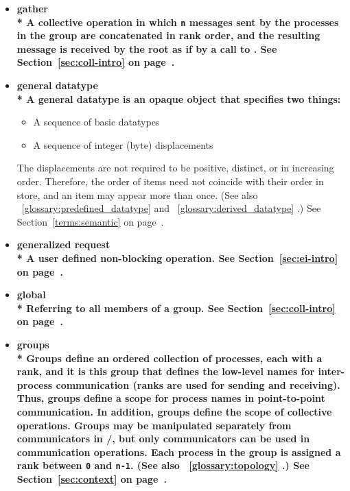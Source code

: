 \begin{itemize}
\label{glossary:gather}
\item \bf{ gather} \\*
A collective operation in which {\tt n} messages sent by the
processes in the group are concatenated in rank order, and the
resulting message is received by the root as if by a call to
.
See Section~\ref{sec:coll-intro} on page~\pageref{sec:coll-intro}.

\label{glossary:general_datatype}
\item \bf{ general datatype} \\*
A {\bf general datatype} is an opaque object that specifies two
things:
\begin{itemize}
\item
A sequence of basic datatypes
\item
A sequence of integer (byte) displacements
\end{itemize}
The displacements are not required to be positive, distinct, or
in increasing order. Therefore, the order of items need not
coincide with their order in store, and an item may appear more than
once. (See also ~\ref{glossary:predefined_datatype} and ~\ref{glossary:derived_datatype} .)
See Section~\ref{terms:semantic} on page~\pageref{terms:semantic}.

\label{glossary:generalized_request}
\item \bf{ generalized request} \\*
A user defined non-blocking operation.
See Section~\ref{sec:ei-intro} on page~\pageref{sec:ei-intro}.

\label{glossary:global}
\item \bf{ global} \\*
Referring to all members of a group.
See Section~\ref{sec:coll-intro} on page~\pageref{sec:coll-intro}.

\label{glossary:groups}
\item \bf{ groups} \\*
Groups define an ordered collection of processes, each with a rank, and it is this
group that defines the low-level names for inter-process communication (ranks
are used for sending and receiving).  Thus, groups define a scope for process
names in point-to-point communication.  In addition, groups define the scope
of collective operations.  Groups may be manipulated separately from
communicators in \MPI/, but only communicators can be used in
communication operations. Each process in
the group is assigned a rank between {\tt 0} and {\tt n-1}.
(See also ~\ref{glossary:topology} .)
See Section~\ref{sec:context} on page~\pageref{sec:context}.


\end{itemize}
